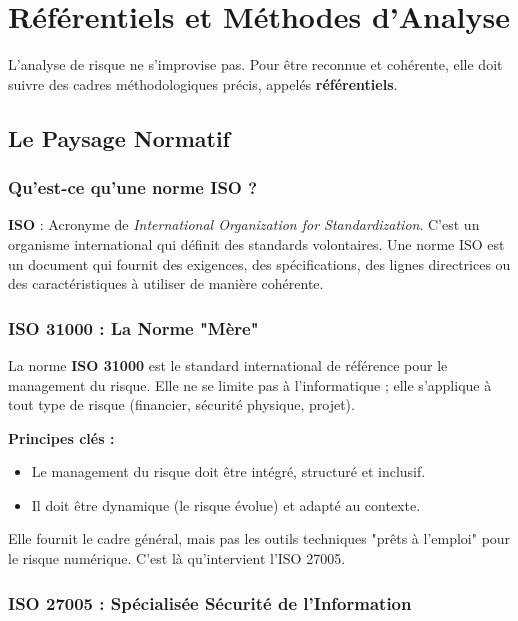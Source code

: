 \chapter{Référentiels et Méthodes d'Analyse}
\label{chap:referentiels}

L'analyse de risque ne s'improvise pas. Pour être reconnue et cohérente, elle doit suivre des cadres méthodologiques précis, appelés \textbf{référentiels}.

\section{Le Paysage Normatif}

\subsection{Qu'est-ce qu'une norme ISO ?}

\begin{boxdef}
\textbf{ISO} : Acronyme de \textit{International Organization for Standardization}. C'est un organisme international qui définit des standards volontaires. Une norme ISO est un document qui fournit des exigences, des spécifications, des lignes directrices ou des caractéristiques à utiliser de manière cohérente.
\end{boxdef}

\subsection{ISO 31000 : La Norme "Mère"}

La norme \textbf{ISO 31000} est le standard international de référence pour le management du risque. Elle ne se limite pas à l'informatique ; elle s'applique à tout type de risque (financier, sécurité physique, projet).

\textbf{Principes clés :}
\begin{itemize}
    \item Le management du risque doit être intégré, structuré et inclusif.
    \item Il doit être dynamique (le risque évolue) et adapté au contexte.
\end{itemize}

Elle fournit le cadre général, mais pas les outils techniques "prêts à l'emploi" pour le risque numérique. C'est là qu'intervient l'ISO 27005.

\subsection{ISO 27005 : Spécialisée Sécurité de l'Information}


